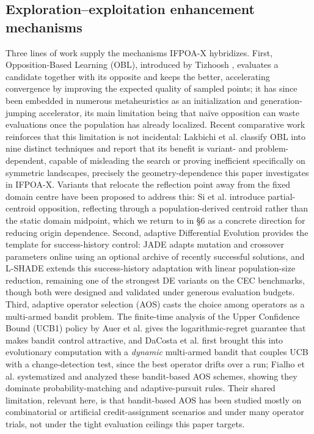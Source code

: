 \documentclass[preprint,12pt]{elsarticle}
\begin{document}
\subsection{Exploration--exploitation enhancement mechanisms}
\label{subsec2-2}

Three lines of work supply the mechanisms IFPOA-X hybridizes. First, Opposition-Based Learning (OBL), introduced by Tizhoosh \cite{tizhoosh2005opposition}, evaluates a candidate together with its opposite and keeps the better, accelerating convergence by improving the expected quality of sampled points; it has since been embedded in numerous metaheuristics as an initialization and generation-jumping accelerator, its main limitation being that na\"ive opposition can waste evaluations once the population has already localized. Recent comparative work reinforces that this limitation is not incidental: Lakbichi et al. \cite{lakbichi2025opposition} classify OBL into nine distinct techniques and report that its benefit is variant- and problem-dependent, capable of misleading the search or proving inefficient specifically on symmetric landscapes, precisely the geometry-dependence this paper investigates in IFPOA-X. Variants that relocate the reflection point away from the fixed domain centre have been proposed to address this: Si et al. \cite{si2023pcobl} introduce partial-centroid opposition, reflecting through a population-derived centroid rather than the static domain midpoint, which we return to in \S6 as a concrete direction for reducing origin dependence. Second, adaptive Differential Evolution provides the template for success-history control: JADE \cite{zhang2009jade} adapts mutation and crossover parameters online using an optional archive of recently successful solutions, and L-SHADE \cite{tanabe2014improving} extends this success-history adaptation with linear population-size reduction, remaining one of the strongest DE variants on the CEC benchmarks, though both were designed and validated under generous evaluation budgets. Third, adaptive operator selection (AOS) casts the choice among operators as a multi-armed bandit problem. The finite-time analysis of the Upper Confidence Bound (UCB1) policy by Auer et al. \cite{auer2002finite} gives the logarithmic-regret guarantee that makes bandit control attractive, and DaCosta et al. \cite{dacosta2008adaptive} first brought this into evolutionary computation with a \emph{dynamic} multi-armed bandit that couples UCB with a change-detection test, since the best operator drifts over a run; Fialho et al. \cite{fialho2010analyzing} systematized and analyzed these bandit-based AOS schemes, showing they dominate probability-matching and adaptive-pursuit rules. Their shared limitation, relevant here, is that bandit-based AOS has been studied mostly on combinatorial or artificial credit-assignment scenarios and under many operator trials, not under the tight evaluation ceilings this paper targets.
\end{document}
